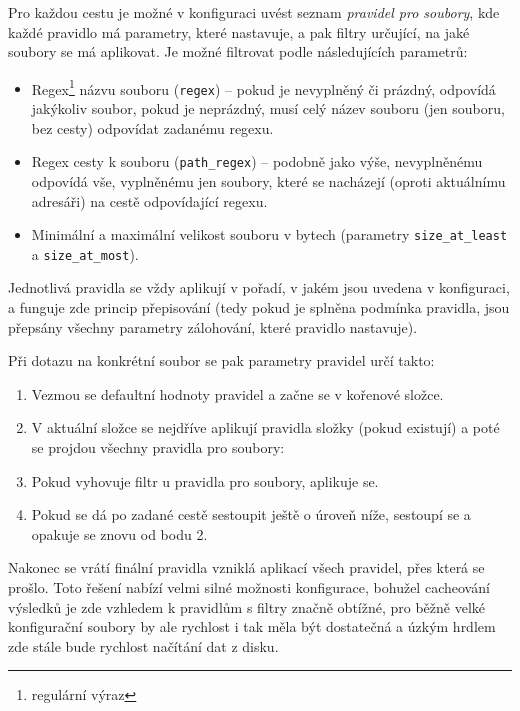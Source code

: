 Pro každou cestu je možné v konfiguraci uvést seznam {\it pravidel pro soubory},
kde každé pravidlo má parametry, které nastavuje, a pak filtry určující, na jaké
soubory se má aplikovat. Je možné filtrovat podle následujících parametrů:

\begin{itemize}
	\item Regex\footnote{regulární výraz} názvu souboru (\texttt{regex}) --
	pokud je nevyplněný či prázdný, odpovídá jakýkoliv soubor, pokud je
	neprázdný, musí celý název souboru (jen souboru, bez cesty) odpovídat
	zadanému regexu.
	\item Regex cesty k souboru (\texttt{path\_regex}) -- podobně jako výše,
	nevyplněnému odpovídá vše, vyplněnému jen soubory, které se nacházejí
	(oproti aktuálnímu adresáři) na cestě odpovídající regexu.
	\item Minimální a maximální velikost souboru v bytech (parametry
	\texttt{size\_at\_least} a \texttt{size\_at\_most}).
\end{itemize}

Jednotlivá pravidla se vždy aplikují v pořadí, v jakém jsou uvedena v konfiguraci,
a funguje zde princip přepisování (tedy pokud je splněna podmínka pravidla, jsou
přepsány všechny parametry zálohování, které pravidlo nastavuje).

\medskip\goodbreak

\noindent Při dotazu na konkrétní soubor se pak parametry pravidel určí takto:
\begin{enumerate}
	\item Vezmou se defaultní hodnoty pravidel a začne se v kořenové složce.
	\item V aktuální složce se nejdříve aplikují pravidla složky (pokud
	existují) a poté se projdou všechny pravidla pro soubory:
	\item Pokud vyhovuje filtr u pravidla pro soubory, aplikuje se.
	\item Pokud se dá po zadané cestě sestoupit ještě o úroveň níže, sestoupí
	se a opakuje se znovu od bodu 2.
\end{enumerate}

Nakonec se vrátí finální pravidla vzniklá aplikací všech pravidel, přes která se
prošlo. Toto řešení nabízí velmi silné možnosti konfigurace, bohužel cacheování
výsledků je zde vzhledem k pravidlům s filtry značně obtížné, pro běžně velké
konfigurační soubory by ale rychlost i tak měla být dostatečná a úzkým hrdlem
zde stále bude rychlost načítání dat z disku.

